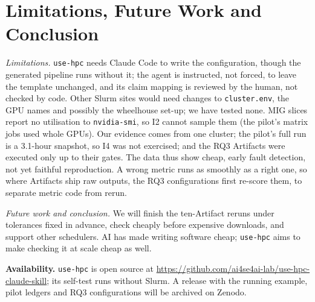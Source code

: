 \documentclass[10pt,conference]{IEEEtran}
\newcommand{\tool}{\texttt{use-hpc}}
\newcommand{\code}[1]{\texttt{#1}}
\begin{document}
\section{Limitations, Future Work and Conclusion}\label{sec:concl}

\emph{Limitations.} \tool{} needs Claude Code to write the configuration, though the generated pipeline runs without it; the agent is instructed, not forced, to leave the template unchanged, and its claim mapping is reviewed by the human, not checked by code. Other Slurm sites would need changes to \code{cluster.env}, the GPU names and possibly the wheelhouse set-up; we have tested none. MIG slices report no utilisation to \code{nvidia-smi}, so I2 cannot sample them (the pilot's matrix jobs used whole GPUs). Our evidence comes from one cluster; the pilot's full run is a 3.1-hour snapshot, so I4 was not exercised; and the RQ3 Artifacts were executed only up to their gates. The data thus show cheap, early fault detection, not yet faithful reproduction. A wrong metric runs as smoothly as a right one, so where Artifacts ship raw outputs, the RQ3 configurations first re-score them, to separate metric code from rerun.

\emph{Future work and conclusion.} We will finish the ten-Artifact reruns under tolerances fixed in advance, check cheaply before expensive downloads, and support other schedulers. AI has made writing software cheap; \tool{} aims to make checking it at scale cheap as well.

\smallskip\noindent\textbf{Availability.}\label{sec:data} \tool{} is open source at \url{https://github.com/ai4se4ai-lab/use-hpc-claude-skill}; its self-test runs without Slurm. A release with the running example, pilot ledgers and RQ3 configurations will be archived on Zenodo.



\end{document}
